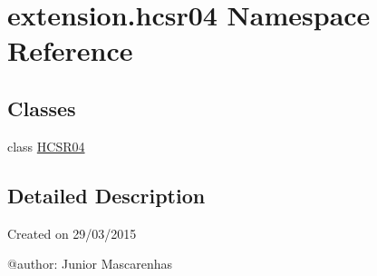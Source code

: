 \hypertarget{namespaceextension_1_1hcsr04}{}\section{extension.\+hcsr04 Namespace Reference}
\label{namespaceextension_1_1hcsr04}
\subsection*{Classes}
\begin{DoxyCompactItemize}
\item 
class \hyperlink{classextension_1_1hcsr04_1_1HCSR04}{H\+C\+S\+R04}
\end{DoxyCompactItemize}


\subsection{Detailed Description}
\begin{DoxyVerb}Created on 29/03/2015

@author: Junior Mascarenhas
\end{DoxyVerb}
 
